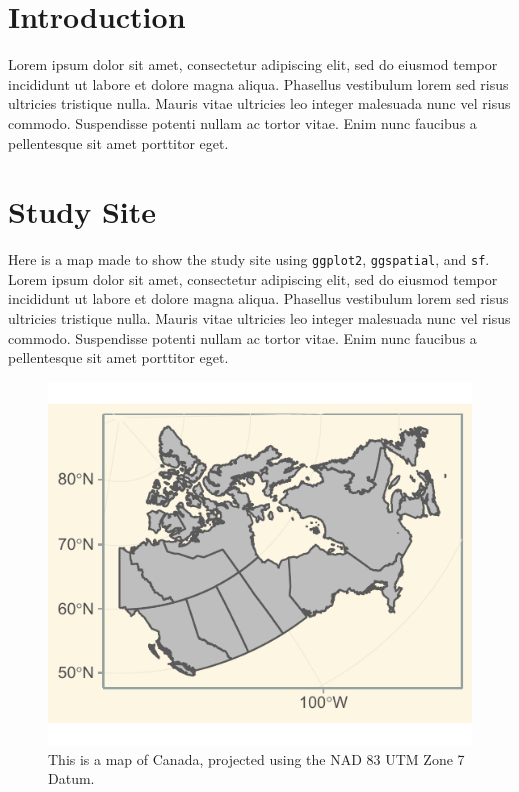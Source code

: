\documentclass[article,30pt,extrafontsizes]{memoir}
\begin{document}
\color{black}
\begin{adjmulticols*}{3}{10mm}{10mm}
\small{
\section{Introduction}\label{introduction}

Lorem ipsum dolor sit amet, \autocite{holden_identifying_2012}
consectetur adipiscing elit, sed do eiusmod tempor incididunt ut labore
et dolore magna aliqua. Phasellus vestibulum lorem sed risus ultricies
tristique nulla. Mauris vitae ultricies leo integer malesuada nunc vel
risus commodo. Suspendisse potenti nullam ac tortor vitae. Enim nunc
faucibus a pellentesque sit amet porttitor eget.

\section{Study Site}\label{study-site}

Here is a map made to show the study site using \texttt{ggplot2},
\texttt{ggspatial}, and \texttt{sf}. Lorem ipsum dolor sit amet,
\autocite{middleton_geological_nodate} consectetur adipiscing elit, sed
do eiusmod tempor incididunt ut labore et dolore magna aliqua. Phasellus
vestibulum lorem sed risus ultricies tristique nulla. Mauris vitae
ultricies leo integer malesuada nunc vel risus commodo. Suspendisse
potenti nullam ac tortor vitae. Enim nunc faucibus a pellentesque sit
amet porttitor eget.

\begin{figure}

{\centering \includegraphics[width=0.5\linewidth]{skeleton_files/figure-latex/unnamed-chunk-2-1} 

}

\caption{This is a map of Canada, projected using the NAD 83 UTM Zone 7 Datum.}\label{fig:unnamed-chunk-2}
\end{figure}

}
\end{adjmulticols*}
\end{document}
